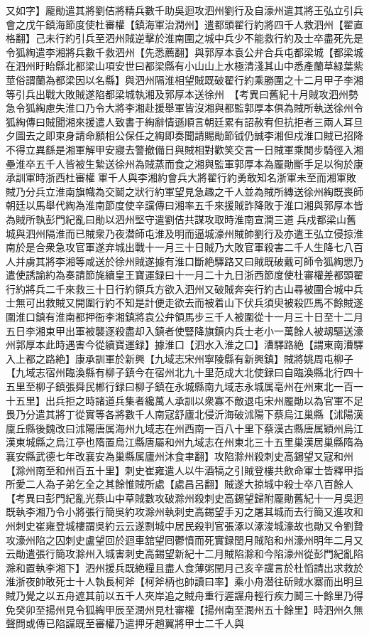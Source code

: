 又如字】龎勛遣其將劉佶將精兵數千助吳迴攻泗州劉行及自濠州遣其將王弘立引兵會之戊午鎮海節度使杜審權【鎮海軍治潤州】遣都頭翟行約將四千人救泗州【翟直格翻】己未行約引兵至泗州賊逆擊於淮南圍之城中兵少不能救行約及士卒盡死先是令狐綯遣李湘將兵數千救泗州【先悉薦翻】與郭厚本袁公弁合兵屯都梁城【都梁城在泗州盱眙縣北都梁山項安世曰都梁縣有小山山上水極清淺其山中悉產蘭草緑葉紫莖俗謂蘭為都梁因以名縣】與泗州隔淮相望賊既破翟行約乘勝圍之十二月甲子李湘等引兵出戰大敗賊遂陷都梁城執湘及郭厚本送徐州　【考異曰舊紀十月賊攻泗州勢急令狐綯慮失淮口乃令大將李湘赴援舉軍皆沒湘與都監郭厚本俱為賊所執送徐州令狐綯傳曰賊聞湘來援遣人致書于綯辭情遜順言朝廷累有詔赦宥但抗拒者三兩人耳旦夕圖去之即束身請命願相公保任之綯即奏聞請賜勛節钺仍誠李湘但戍淮口賊已招降不得立異繇是湘軍解甲安寢去警撤備日與賊相對歡笑交言一日賊軍乘閒步騎徑入湘壘淮卒五千人皆被生縶送徐州為賊蒸而食之湘與監軍郭厚本為龎勛斷手足以徇於康承訓軍時浙西杜審權軍千人與李湘約會兵大將翟行約勇敢知名浙軍未至而湘軍敗賊乃分兵立淮南旗幟為交鬬之狀行約軍望見急趣之千人並為賊所縳送徐州綯既喪師朝廷以馬舉代綯為淮南節度使辛讜傳曰湘率五千來援賊詐降敗于淮口湘與郭厚本皆為賊所執彭門紀亂曰勛以泗州堅守遣劉佶共謀攻取時淮南宣潤三道兵戍都梁山舊城與泗州隔淮而已賊衆乃夜潜師屯淮及明而逼城濠州賊帥劉行及亦遣王弘立侵掠淮南於是合衆急攻官軍遂弃城出戰十一月三十日賊乃大敗官軍殺害二千人生降七八百人并虜其將李湘等咸送於徐州賊遂據有淮口斷絶驛路又曰賊既破戴可師令狐綯愳乃遣使誘諭約為奏請節旄續皇王寶運録曰十一月二十九日浙西節度使杜審權差都頭翟行約將兵二千來救三十日行約領兵方欲入泗州又破賊奔突行約古山尋被圍合城中兵士無可出救賊又開圍行約不知是計便走欲去而被着山下伏兵須臾被殺匹馬不餘賊遂圍淮口鎮有淮南都押衙李湘鎮將袁公弁領馬步三千人被圍從十一月三十日至十二月五日李湘束甲出軍被襲逐殺盡却入鎮者使豎降旗鎮内兵士老小一萬餘人被刼驅送濠州郭厚本此時遇害今從續寶運録】據淮口【泗水入淮之口】漕驛路絶【謂東南漕驛入上都之路絶】康承訓軍於新興【九域志宋州寧陵縣有新興鎮】賊將姚周屯柳子【九域志宿州臨渙縣有柳子鎮今在宿州北九十里范成大北使録曰自臨渙縣北行四十五里至柳子鎮張舜民郴行録曰柳子鎮在永城縣南九域志永城属亳州在州東北一百一十五里】出兵拒之時諸道兵集者纔萬人承訓以衆寡不敵退屯宋州龎勛以為官軍不足畏乃分遣其將丁從實等各將數千人南寇舒廬北侵沂海破沭陽下蔡烏江巢縣【沭陽漢廩丘縣後魏改曰沭陽唐属海州九域志在州西南一百八十里下蔡漢古縣唐属穎州烏江漢東城縣之烏江亭也隋置烏江縣唐屬和州九域志在州東北三十五里巢漢居巢縣隋為襄安縣武德七年改襄安為巢縣属廬州沐食聿翻】攻陷滁州殺刺史高錫望又寇和州【滁州南至和州百五十里】刺史崔雍遣人以牛酒犒之引賊登樓共飲命軍士皆釋甲指所愛二人為子弟乞全之其餘惟賊所處【處昌呂翻】賊遂大掠城中殺士卒八百餘人　【考異曰彭門紀亂光蔡山中草賊數攻破滁州殺刺史高錫望歸附龎勛舊紀十一月吳迥既執李湘乃令小將張行簡吳約攻滁州執刺史高錫望手刃之屠其城而去行簡又進攻和州刺史崔雍登城樓謂吳約云云遂剽城中居民殺判官張涿以涿浚城濠故也勛又令劉贄攻濠州陷之囚刺史盧望回於迴車舘望囘鬱憤而死實録閏月賊陷和州濠州明年二月又云勛遣張行簡攻滁州入城害刺史高錫望新紀十二月賊陷滁和今陷濠州從彭門紀亂陷滁和置執李湘下】泗州援兵既絶糧且盡人食薄粥閏月己亥辛讜言於杜慆請出求救於淮浙夜帥敢死士十人執長柯斧【柯斧柄也帥讀曰率】乘小舟潜往斫賊水寨而出明旦賊乃覺之以五舟遮其前以五千人夾岸追之賊舟重行遲讜舟輕行疾力鬭三十餘里乃得免癸卯至揚州見令狐綯甲辰至潤州見杜審權【揚州南至潤州五十餘里】時泗州久無聲問或傳已陷讜既至審權乃遣押牙趙翼將甲士二千人與